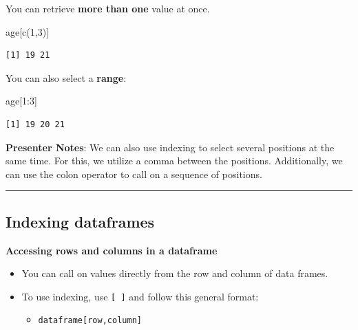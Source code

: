 \documentclass[
  letterpaper,
  DIV=11,
  numbers=noendperiod]{scrartcl}
\newenvironment{Shaded}{\begin{snugshade}}{\end{snugshade}}
\newcommand{\DecValTok}[1]{\textcolor[rgb]{0.68,0.00,0.00}{#1}}
\newcommand{\FunctionTok}[1]{\textcolor[rgb]{0.28,0.35,0.67}{#1}}
\newcommand{\NormalTok}[1]{\textcolor[rgb]{0.00,0.23,0.31}{#1}}
\newcommand{\SpecialCharTok}[1]{\textcolor[rgb]{0.37,0.37,0.37}{#1}}
\providecommand{\tightlist}{%
  \setlength{\itemsep}{0pt}\setlength{\parskip}{0pt}}
\begin{document}
You can retrieve \textbf{more than one} value at once.

\begin{Shaded}
\begin{Highlighting}[]
\NormalTok{age[}\FunctionTok{c}\NormalTok{(}\DecValTok{1}\NormalTok{,}\DecValTok{3}\NormalTok{)]}
\end{Highlighting}
\end{Shaded}

\begin{verbatim}
[1] 19 21
\end{verbatim}

You can also select a \textbf{range}:

\begin{Shaded}
\begin{Highlighting}[]
\NormalTok{age[}\DecValTok{1}\SpecialCharTok{:}\DecValTok{3}\NormalTok{]}
\end{Highlighting}
\end{Shaded}

\begin{verbatim}
[1] 19 20 21
\end{verbatim}

\textbf{Presenter Notes}: We can also use indexing to select several
positions at the same time. For this, we utilize a comma between the
positions. Additionally, we can use the colon operator to call on a
sequence of positions.

\begin{center}\rule{0.5\linewidth}{0.5pt}\end{center}

\subsection{Indexing dataframes}\label{indexing-dataframes}

\textbf{Accessing rows and columns in a dataframe}

\begin{itemize}
\item
  You can call on values directly from the row and column of data
  frames.
\item
  To use indexing, use \texttt{{[}\ {]}} and follow this general format:

  \begin{itemize}
  \tightlist
  \item
    \texttt{dataframe{[}row,column{]}}
  \end{itemize}
\end{itemize}
\end{document}
